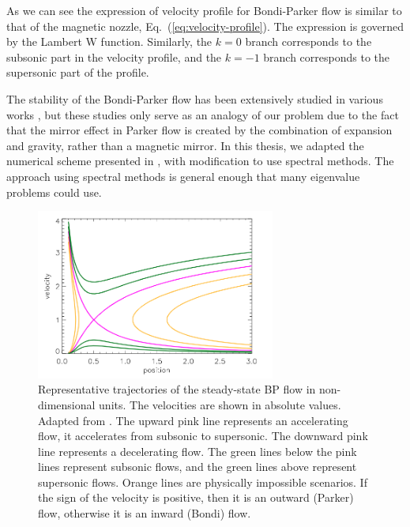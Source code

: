 As we can see the expression of velocity profile for Bondi-Parker flow is similar to that of the magnetic nozzle, Eq.~(\ref{eq:velocity-profile}). The expression is governed by the Lambert W function. Similarly, the $k=0$ branch corresponds to the subsonic part in the velocity profile, and the $k=-1$ branch corresponds to the supersonic part of the profile.

The stability of the Bondi-Parker flow has been extensively studied in various works \cite{bondi_spherically_1952,velli_from_1994,velli_hydrodynamics_2001,del_dynamical_1998,keto_stability_2020,aikawa_stability_1979,stellingwerf_stability_1978}, but these studies only serve as an analogy of our problem due to the fact that the mirror effect in Parker flow is created by the combination of expansion and gravity, rather than a magnetic mirror. In this thesis, we adapted the numerical scheme presented in \cite{stellingwerf_stability_1978}, with modification to use spectral methods. The approach using spectral methods is general enough that many eigenvalue problems could use.

\begin{figure}[htbp]
	\centering
	\includegraphics[width=0.7\textwidth]{figures/steady-state-BP-flow}
	\caption{Representative trajectories of the steady-state BP flow in non-dimensional units. The velocities are shown in absolute values. Adapted from \cite{keto_stability_2020}. The upward pink line represents an accelerating flow, it accelerates from subsonic to supersonic. The downward pink line represents a decelerating flow. The green lines below the pink lines represent subsonic flows, and the green lines above represent supersonic flows. Orange lines are physically impossible scenarios. If the sign of the velocity is positive, then it is an outward (Parker) flow, otherwise it is an inward (Bondi) flow.}
	\label{fig:BP-flow-velocity}
\end{figure}

